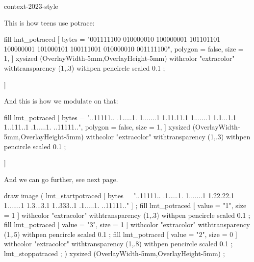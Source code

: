 
\environment context-2023-style

\startdocument
  [title={challenge},
   banner={a bit of fun},
   location={context\enspace {\bf 2023}\enspace meeting}]


\setupbackgrounds
  [text]
  [text]
  [state=stop]


\starttitle[title=The Sundqvist Smiley]

This is how teens use potrace:

\startbuffer
fill
    lmt_potraced [ bytes =
        "001111100
         010000010
         100000001
         101101101
         100000001
         101000101
         100111001
         010000010
         001111100",
         polygon = false,
         size = 1,
    ] xysized (OverlayWidth-5mm,OverlayHeight-5mm)
    withcolor "extracolor"
    withtransparency (1,.3)
    withpen pencircle scaled 0.1 ;
\stopbuffer

\typebuffer[style=\switchtobodyfont[9pt]\ttbf]

\stoptitle

\starttitle[title=An alternate view]

And this is how we modulate on that:

\startbuffer
fill
    lmt_potraced [ bytes =
        "..11111..
         .1.....1.
         1.......1
         1.11.11.1
         1.......1
         1.1...1.1
         1..111..1
         .1.....1.
         ..11111..",
         polygon = false,
         size = 1,
    ] xysized (OverlayWidth-5mm,OverlayHeight-5mm)
    withcolor "extracolor"
    withtransparency (1,.3)
    withpen pencircle scaled 0.1 ;
\stopbuffer

\typebuffer[style=\switchtobodyfont[9pt]\ttbf]

And we can go further, see next page.

\stoptitle

\starttitle[title=Some more detail]

\startbuffer
draw image (
    lmt_startpotraced [ bytes =
        "..11111..
         .1.....1.
         1.......1
         1.22.22.1
         1.......1
         1.3...3.1
         1..333..1
         .1.....1.
         ..11111.."
    ] ;
    fill lmt_potraced [ value = "1", size = 1 ]
        withcolor "extracolor" withtransparency (1,.3)
        withpen pencircle scaled 0.1 ;
    fill lmt_potraced [ value = "3", size = 1 ]
        withcolor "extracolor" withtransparency (1,.5)
        withpen pencircle scaled 0.1 ;
    fill lmt_potraced [ value = "2", size = 0 ]
        withcolor "extracolor" withtransparency (1,.8)
        withpen pencircle scaled 0.1 ;
    lmt_stoppotraced ;
) xysized (OverlayWidth-5mm,OverlayHeight-5mm) ;
\stopbuffer

